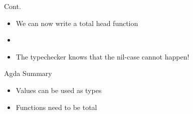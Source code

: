 \begin{frame}[fragile]{Cont.}
\begin{itemize}
\item We can now write a total head function
\item \begin{code}
\> \AgdaSymbol{:}  \AgdaSymbol{\{} \AgdaSymbol{\}}    \AgdaSymbol{(} \AgdaSymbol{)}  \<%
\\
\> \AgdaSymbol{(}  \AgdaSymbol{)} \AgdaSymbol{=} \<%
\end{code}
\item The typechecker knows that the nil-case cannot happen!
\end{itemize}
\end{frame}

\begin{frame}{Agda Summary}
\begin{itemize}
\item Values can be used as types
\item Functions need to be total
\end{itemize}
\end{frame}
